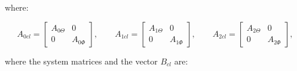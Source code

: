 \documentclass[main.tex]{subfiles}
\begin{document}
	where:

	\begin{equation*}
	A_{0cl} = 
	\begin{bmatrix}
	A_{0\Theta} & 0 \\
	0 & A_{0\Phi}
	\end{bmatrix}, \qquad
	A_{1cl} =
	\begin{bmatrix}
	A_{1\Theta} & 0 \\
	0 & A_{1\Phi}
	\end{bmatrix}, \qquad
	A_{2cl} =
	\begin{bmatrix}
	A_{2\Theta} & 0 \\
	0 & A_{2\Phi}
	\end{bmatrix},
	\end{equation*}
	
	where the system matrices and the vector $B_{cl}$ are:
	
\end{document}
